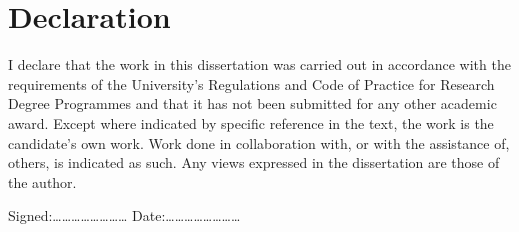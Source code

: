 \chapter*{Declaration}

I declare that the work in this dissertation was carried out in accordance with the requirements of the University's 
Regulations and Code of Practice for Research Degree Programmes and that it has not been submitted for any other academic 
award. Except where indicated by specific reference in the text, the work is the candidate's own work. Work done in 
collaboration with, or with the assistance of, others, is indicated as such. Any views expressed in the dissertation are 
those of the author.

\vspace{4cm}
\noindent
Signed:\ldots\ldots\ldots\ldots\ldots\ldots\ldots\ldots \hfill
Date:\ldots\ldots\ldots\ldots\ldots\ldots\ldots\ldots
